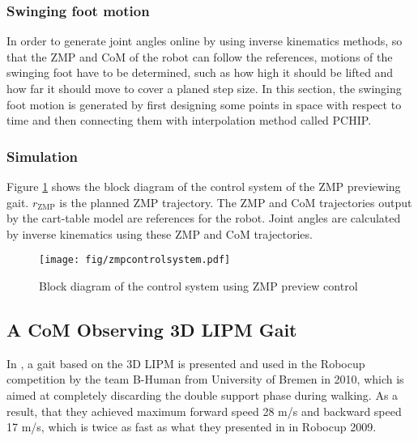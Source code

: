 \subsubsection{Swinging foot motion}
In order to generate joint angles online by using inverse kinematics methods, so that the ZMP and CoM of the robot can follow the references, motions of the swinging foot have to be determined, such as how high it should be lifted and how far it should move to cover a planed step size. %
In this section, the swinging foot motion is generated by first designing some points in space with respect to time and then connecting them with interpolation method called \ac{PCHIP}. 



\subsubsection{Simulation}
Figure {\ref{zmppreviewblock}} shows the block diagram of the control system of the ZMP previewing gait. $ r_{\mathrm{ZMP}} $ is the planned ZMP trajectory. The ZMP and CoM trajectories output by the cart-table model are references for the robot. Joint angles are calculated by inverse kinematics using these ZMP and CoM trajectories.
\begin{figure}[H]
	\centering
	\texttt{[image: fig/zmpcontrolsystem.pdf]}
	\caption{Block diagram of the control system using ZMP preview control}
	\label{zmppreviewblock}
\end{figure}

\subsection{A CoM Observing 3D LIPM Gait}
\label{3dlipmgait}
In \cite{Humanoids-Graf-Roefer-10}, a gait based on the 3D \ac{LIPM} is presented and used in the Robocup competition by the team B-Human from University of Bremen in 2010, which is aimed at completely discarding the double support phase during walking. As a result, that they achieved maximum forward speed \si{28} {m/s} and backward speed \si{17} {m/s}, which is twice as fast as what they presented in \cite{graf2009robust} in Robocup 2009.

